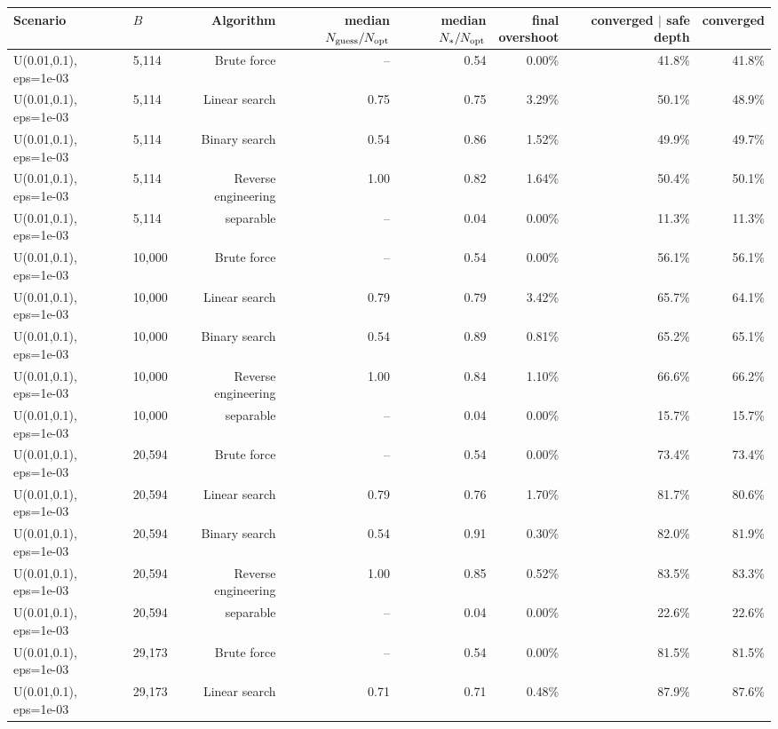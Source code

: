 \begin{tabular}{llrrrrrr}
\toprule
Scenario & $B$ & Algorithm & \makecell{median\\$N_{\rm guess}/N_{\rm opt}$} & \makecell{median\\$N_*/N_{\rm opt}$} & \makecell{final\\overshoot} & \makecell{converged\\$\mid$ safe depth} & converged \\
\midrule
U(0.01,0.1), eps=1e-03 & 5,114 & Brute force & -- & 0.54 & 0.00\% & 41.8\% & 41.8\% \\
U(0.01,0.1), eps=1e-03 & 5,114 & Linear search & 0.75 & 0.75 & 3.29\% & 50.1\% & 48.9\% \\
U(0.01,0.1), eps=1e-03 & 5,114 & Binary search & 0.54 & 0.86 & 1.52\% & 49.9\% & 49.7\% \\
U(0.01,0.1), eps=1e-03 & 5,114 & Reverse engineering & 1.00 & 0.82 & 1.64\% & 50.4\% & 50.1\% \\
U(0.01,0.1), eps=1e-03 & 5,114 & separable & -- & 0.04 & 0.00\% & 11.3\% & 11.3\% \\
U(0.01,0.1), eps=1e-03 & 10,000 & Brute force & -- & 0.54 & 0.00\% & 56.1\% & 56.1\% \\
U(0.01,0.1), eps=1e-03 & 10,000 & Linear search & 0.79 & 0.79 & 3.42\% & 65.7\% & 64.1\% \\
U(0.01,0.1), eps=1e-03 & 10,000 & Binary search & 0.54 & 0.89 & 0.81\% & 65.2\% & 65.1\% \\
U(0.01,0.1), eps=1e-03 & 10,000 & Reverse engineering & 1.00 & 0.84 & 1.10\% & 66.6\% & 66.2\% \\
U(0.01,0.1), eps=1e-03 & 10,000 & separable & -- & 0.04 & 0.00\% & 15.7\% & 15.7\% \\
U(0.01,0.1), eps=1e-03 & 20,594 & Brute force & -- & 0.54 & 0.00\% & 73.4\% & 73.4\% \\
U(0.01,0.1), eps=1e-03 & 20,594 & Linear search & 0.79 & 0.76 & 1.70\% & 81.7\% & 80.6\% \\
U(0.01,0.1), eps=1e-03 & 20,594 & Binary search & 0.54 & 0.91 & 0.30\% & 82.0\% & 81.9\% \\
U(0.01,0.1), eps=1e-03 & 20,594 & Reverse engineering & 1.00 & 0.85 & 0.52\% & 83.5\% & 83.3\% \\
U(0.01,0.1), eps=1e-03 & 20,594 & separable & -- & 0.04 & 0.00\% & 22.6\% & 22.6\% \\
U(0.01,0.1), eps=1e-03 & 29,173 & Brute force & -- & 0.54 & 0.00\% & 81.5\% & 81.5\% \\
U(0.01,0.1), eps=1e-03 & 29,173 & Linear search & 0.71 & 0.71 & 0.48\% & 87.9\% & 87.6\% \\

\end{tabular}
